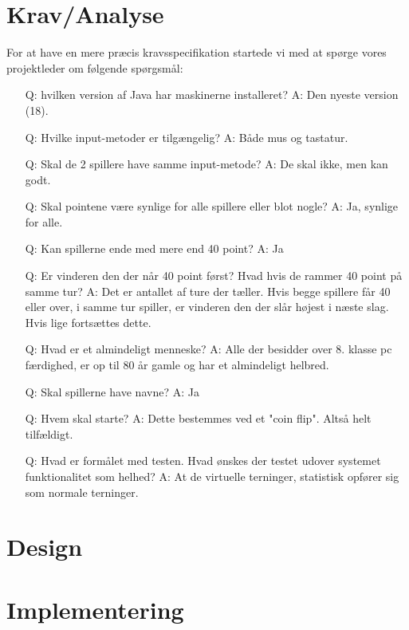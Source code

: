 \documentclass{article}
\begin{document}
\section{Krav/Analyse}
For at have en mere præcis kravsspecifikation startede vi med at spørge vores projektleder om følgende spørgsmål:
\begin{itemize}
    \item [Q:] hvilken version af Java har maskinerne installeret?
            \subitem A: Den nyeste version (18).
    \item [Q:]Hvilke input-metoder er tilgængelig?
            \subitem A: Både mus og tastatur.
    \item [Q:]Skal de 2 spillere have samme input-metode?
            \subitem A: De skal ikke, men kan godt.
    \item [Q:]Skal pointene være synlige for alle spillere eller blot nogle?
            \subitem A: Ja, synlige for alle.
    \item [Q:]Kan spillerne ende med mere end 40 point?
            \subitem A: Ja
    \item [Q:]Er vinderen den der når 40 point først? Hvad hvis de rammer 40 point på samme tur?
            \subitem A: Det er antallet af ture der tæller. Hvis begge spillere får 40 eller over, i samme tur spiller, er vinderen den der slår højest i næste slag. Hvis lige fortsættes dette.
    \item [Q:]Hvad er et almindeligt menneske?
            \subitem A: Alle der besidder over 8. klasse pc færdighed, er op til 80 år gamle og har et almindeligt helbred.
    \item [Q:] Skal spillerne have navne?
            \subitem A: Ja
    \item [Q:]Hvem skal starte?
            \subitem A: Dette bestemmes ved et "coin flip". Altså helt tilfældigt.
    \item [Q:]Hvad er formålet med testen. Hvad ønskes der testet udover systemet funktionalitet som helhed?
        \subitem A: At de virtuelle terninger, statistisk opfører sig som normale terninger.
\end{itemize}

\section{Design}


\section{Implementering}
\end{document}
